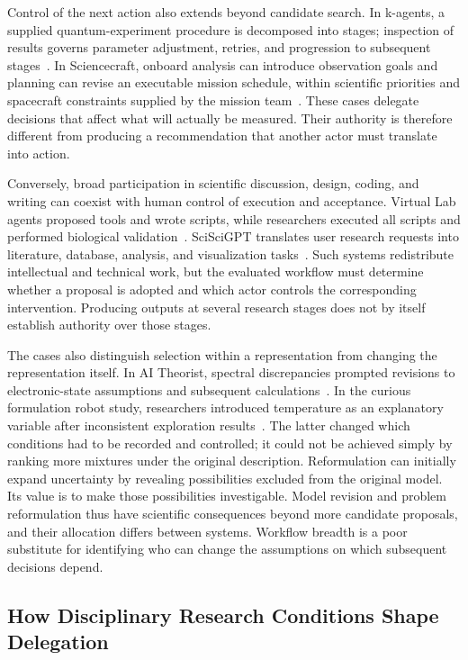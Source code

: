 Control of the next action also extends beyond candidate search. In k-agents, a supplied quantum-experiment procedure is decomposed into stages; inspection of results governs parameter adjustment, retries, and progression to subsequent stages~\cite{asd0090}. In Sciencecraft, onboard analysis can introduce observation goals and planning can revise an executable mission schedule, within scientific priorities and spacecraft constraints supplied by the mission team~\cite{asd0645}. These cases delegate decisions that affect what will actually be measured. Their authority is therefore different from producing a recommendation that another actor must translate into action.

Conversely, broad participation in scientific discussion, design, coding, and writing can coexist with human control of execution and acceptance. Virtual Lab agents proposed tools and wrote scripts, while researchers executed all scripts and performed biological validation~\cite{asd0054}. SciSciGPT translates user research requests into literature, database, analysis, and visualization tasks~\cite{asd0624}. Such systems redistribute intellectual and technical work, but the evaluated workflow must determine whether a proposal is adopted and which actor controls the corresponding intervention. Producing outputs at several research stages does not by itself establish authority over those stages.

The cases also distinguish selection within a representation from changing the representation itself. In AI Theorist, spectral discrepancies prompted revisions to electronic-state assumptions and subsequent calculations~\cite{asd1081}. In the curious formulation robot study, researchers introduced temperature as an explanatory variable after inconsistent exploration results~\cite{asd0575}. The latter changed which conditions had to be recorded and controlled; it could not be achieved simply by ranking more mixtures under the original description. Reformulation can initially expand uncertainty by revealing possibilities excluded from the original model. Its value is to make those possibilities investigable. Model revision and problem reformulation thus have scientific consequences beyond more candidate proposals, and their allocation differs between systems. Workflow breadth is a poor substitute for identifying who can change the assumptions on which subsequent decisions depend.

\subsection{How Disciplinary Research Conditions Shape Delegation}
\label{sec:conditions-delegation}

